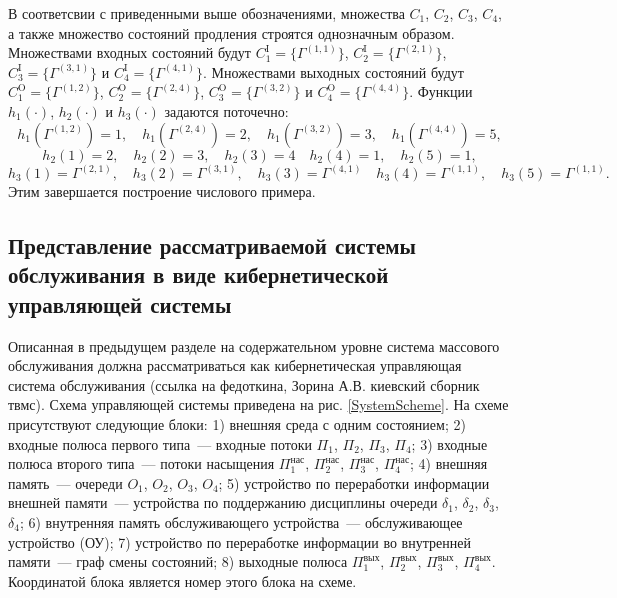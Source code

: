 \documentclass[a4paper,12pt,russian]{extarticle}
\newcommand{\ga}[1]{\Gamma^{\left( #1 \right)} }
\begin{document}
В соответсвии с приведенными выше обозначениями, множества $C_1$, $C_2$, $C_3$, $C_4$, а также множество состояний продления строятся однозначным образом. Множествами входных состояний будут $C_1^{\mathrm{I}}=\{\ga{1,1}\}$, $C_2^{\mathrm{I}}=\{\ga{2,1}\}$, $C_3^{\mathrm{I}}=\{\ga{3,1}\}$ и $C_4^{\mathrm{I}}=\{\ga{4,1}\}$. Множествами выходных состояний будут $C_1^{\mathrm{O}}=\{\ga{1,2}\}$, $C_2^{\mathrm{O}}=\{\ga{2,4}\}$, $C_3^{\mathrm{O}}=\{\ga{3,2}\}$ и $C_4^{\mathrm{O}}=\{\ga{4,4}\}$. Функции $h_1(\cdot)$, $h_2(\cdot)$ и $h_3(\cdot)$ задаются поточечно:
\begin{equation*}
h_1(\ga{1,2})=1, \quad h_1(\ga{2,4})=2, \quad h_1(\ga{3,2})=3, \quad h_1(\ga{4,4})=5,
\end{equation*}
\begin{equation*}
h_2(1)=2, \quad h_2(2)=3, \quad h_2(3)=4 \quad h_2(4)=1, \quad h_2(5)=1,
\end{equation*}
\begin{equation*}
h_3(1)=\ga{2,1}, \quad h_3(2)=\ga{3,1}, \quad h_3(3)=\ga{4,1} \quad h_3(4)=\ga{1,1}, \quad h_3(5)=\ga{1,1}.
\end{equation*}
Этим завершается построение числового примера.

\subsection{Представление рассматриваемой системы обслуживания в виде кибернетической управляющей системы}
Описанная в предыдущем разделе на содержательном уровне система массового обслуживания должна рассматриваться как кибернетическая управляющая система обслуживания (ссылка на федоткина, Зорина А.В. киевский сборник твмс). Схема управляющей системы приведена на рис. \ref{SystemScheme}. На схеме присутствуют следующие блоки: 1) внешняя среда с одним состоянием; 2) входные полюса первого типа~--- входные потоки $\Pi_1$, $\Pi_2$, $\Pi_3$, $\Pi_4$; 3) входные полюса второго типа~--- потоки насыщения $\Pi_1^{\mathrm{\text{нас}}}$, $\Pi_2^{\mathrm{\text{нас}}}$, $\Pi_3^{\mathrm{\text{нас}}}$, $\Pi_4^{\mathrm{\text{нас}}}$; 4) внешняя память~--- очереди $O_1$, $O_2$, $O_3$, $O_4$; 5) устройство по переработки информации внешней памяти~--- устройства по поддержанию дисциплины очереди $\delta_1$, $\delta_2$, $\delta_3$, $\delta_4$; 6) внутренняя память обслуживающего устройства~--- обслуживающее устройство (ОУ); 7) устройство по переработке информации во внутренней памяти~--- граф смены состояний; 8) выходные полюса $\Pi_1^{\mathrm{\text{вых}}}$, $\Pi_2^{\mathrm{\text{вых}}}$, $\Pi_3^{\mathrm{\text{вых}}}$, $\Pi_4^{\mathrm{\text{вых}}}$. Координатой блока является номер этого блока на схеме. 
\end{document}
